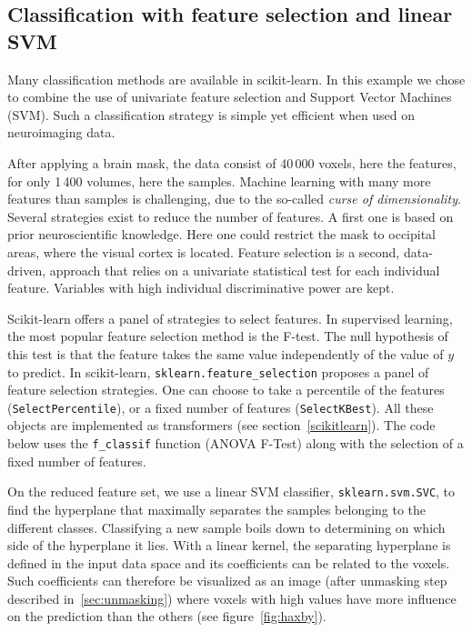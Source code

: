 \documentclass{frontiersSCNS} %
\begin{document}
\subsection{Classification with feature selection and linear SVM}

Many classification methods are available in scikit-learn. In this
example we chose to
combine the use of univariate feature selection and Support Vector
Machines (SVM). Such a classification strategy is simple
yet efficient when used on neuroimaging data.

\smallskip

After applying a brain mask, the data consist of 40\,000 voxels, here
the features, for only 1\,400 volumes, here the samples.
Machine learning with many more features than samples
is challenging, due to the so-called \emph{curse of dimensionality}.
Several strategies exist to reduce the number of features.
A first one is based on prior neuroscientific
knowledge. Here one could restrict the mask to occipital areas, where the visual
cortex is located. Feature selection is a second, data-driven, approach
that relies on a univariate
statistical test for each individual feature. Variables
with high individual discriminative power are kept.

Scikit-learn offers a panel of strategies to select features. In supervised
learning, the most popular feature selection method is the
F-test. 
The null hypothesis of this test is that the feature takes the same value
independently of the value of $y$ to predict.
In scikit-learn, \verb!sklearn.feature_selection! proposes a panel
of feature selection strategies. One can choose to take a percentile of the features
(\verb!SelectPercentile!), or a fixed number of features (\verb!SelectKBest!).
All these objects are implemented as transformers (see
 section~\ref{scikitlearn}).
The code below uses the \verb!f_classif! function (ANOVA F-Test) along with
the selection of a fixed number of features.

\smallskip

On the reduced feature set, we use a linear SVM classifier, 
\verb!sklearn.svm.SVC!, to find the hyperplane that maximally
separates the samples belonging to the different classes.
Classifying a new sample boils
down to determining on which side of the hyperplane it lies. With a
linear kernel, the separating hyperplane is defined in the input
data space and its coefficients can be related to the voxels.
Such coefficients can therefore be visualized as an image (after
unmasking step described in~\ref{sec:unmasking})
where voxels with high values have more influence on the prediction
than the others (see figure~\ref{fig:haxby}).
\end{document}
